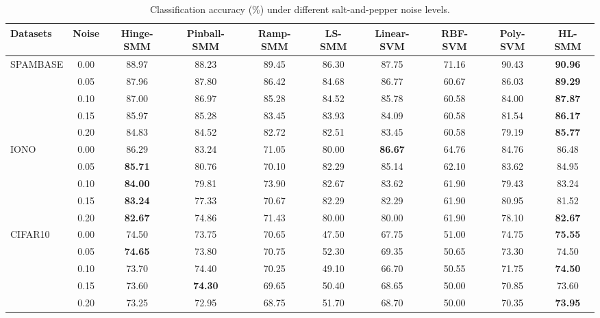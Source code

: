 \documentclass[sn-mathphys]{JORSC-jnl}%
\theoremstyle{thmstyleone}%
\theoremstyle{thmstylethree}%
\theoremstyle{thmstyleone} %
\begin{document}
\begin{table}[t]
\caption{Classification accuracy (\%) under different salt-and-pepper noise levels.}
\label{table3}
\centering
\setlength{\tabcolsep}{3pt}  
\renewcommand{\arraystretch}{1.12}  
\small  

\begin{adjustbox}{width=\textwidth}
\begin{tabular}{lccccccccc}
\toprule  
Datasets & Noise
& Hinge-SMM
& Pinball-SMM
& Ramp-SMM
& LS-SMM
& Linear-SVM
& RBF-SVM
& Poly-SVM
& HL-SMM \\
\midrule  

\multirow{5}{*}{SPAMBASE}
& 0.00 & 88.97 & 88.23 & 89.45 & 86.30 & 87.75 & 71.16 & 90.43 & \textbf{90.96} \\
& 0.05 & 87.96 & 87.80 & 86.42 & 84.68 & 86.77 & 60.67 & 86.03 & \textbf{89.29} \\
& 0.10 & 87.00 & 86.97 & 85.28 & 84.52 & 85.78 & 60.58 & 84.00 & \textbf{87.87} \\
& 0.15 & 85.97 & 85.28 & 83.45 & 83.93 & 84.09 & 60.58 & 81.54 & \textbf{86.17} \\
& 0.20 & 84.83 & 84.52 & 82.72 & 82.51 & 83.45 & 60.58 & 79.19 & \textbf{85.77} \\
\midrule  

\multirow{5}{*}{IONO}
& 0.00 & 86.29 & 83.24 & 71.05 & 80.00 & \textbf{86.67} & 64.76 & 84.76 & 86.48 \\
& 0.05 & \textbf{85.71} & 80.76 & 70.10 & 82.29 & 85.14 & 62.10 & 83.62 & 84.95 \\
& 0.10 & \textbf{84.00} & 79.81 & 73.90 & 82.67 & 83.62 & 61.90 & 79.43 & 83.24 \\
& 0.15 & \textbf{83.24} & 77.33 & 70.67 & 82.29 & 82.29 & 61.90 & 80.95 & 81.52 \\
& 0.20 & \textbf{82.67} & 74.86 & 71.43 & 80.00 & 80.00 & 61.90 & 78.10 & \textbf{82.67} \\
\midrule  

\multirow{5}{*}{CIFAR10}
& 0.00 & 74.50 & 73.75 & 70.65 & 47.50 & 67.75 & 51.00 & 74.75 & \textbf{75.55} \\
& 0.05 & \textbf{74.65} & 73.80 & 70.75 & 52.30 & 69.35 & 50.65 & 73.30 & 74.50 \\
& 0.10 & 73.70 & 74.40 & 70.25 & 49.10 & 66.70 & 50.55 & 71.75 & \textbf{74.50} \\
& 0.15 & 73.60 & \textbf{74.30} & 69.65 & 50.40 & 68.65 & 50.00 & 70.85 & 73.60 \\
& 0.20 & 73.25 & 72.95 & 68.75 & 51.70 & 68.70 & 50.00 & 70.35 & \textbf{73.95} \\
\midrule  


\end{tabular}
\end{adjustbox}
\end{table}
\end{document}
